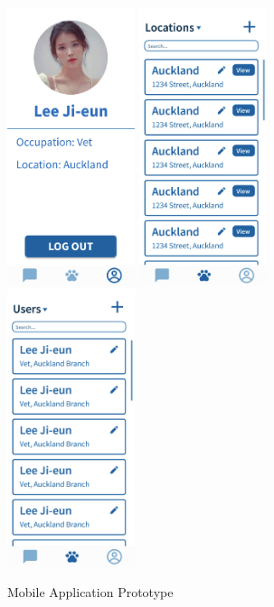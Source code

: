 \begin{figure}
    \includegraphics[width=0.33333\textwidth]{images/mobile/mobile4.png}\hfill
    \includegraphics[width=0.33333\textwidth]{images/mobile/mobile5.png}\hfill
    \includegraphics[width=0.33333\textwidth]{images/mobile/mobile6.png}
    \caption{Mobile Application Prototype}
    \label{fig:mobile}
\end{figure}



